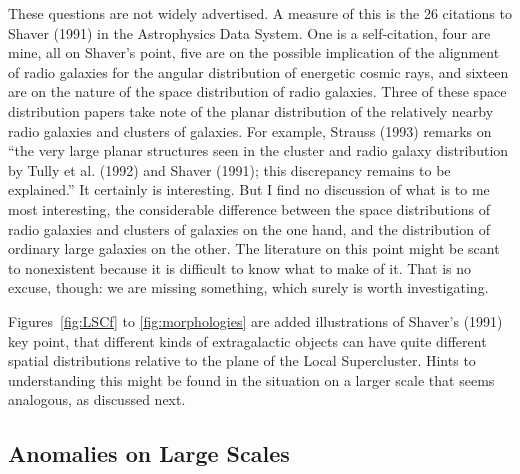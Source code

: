 \documentclass[fleqn,usenatbib]{mnras}
\begin{document}
These questions are not widely advertised. A measure of this is the 26 citations to Shaver (1991) in the Astrophysics Data System. One is a self-citation, four are mine, all on Shaver's point, five are on the possible implication of the alignment of radio galaxies for the angular distribution of energetic cosmic rays, and sixteen are on the nature of the space distribution of radio galaxies. Three of these space distribution papers take note of the planar distribution of the relatively nearby radio galaxies and clusters of galaxies. For example, Strauss (1993) remarks on ``the very large planar structures seen in the cluster and radio galaxy distribution by Tully et al. (1992) and Shaver (1991); this discrepancy remains to be explained.''  It certainly is interesting. But I find no discussion of what is to me most interesting, the considerable difference between the space distributions of radio galaxies and clusters of galaxies on the one hand, and the distribution of ordinary large galaxies on the other. The literature on this point might be scant to nonexistent because it is difficult to know what to make of it. That is no excuse, though: we are missing something, which surely is worth investigating.

Figures~\ref{fig:LSCf} to \ref{fig:morphologies} are added illustrations of Shaver's (1991) key point, that different kinds of extragalactic objects can have quite different spatial distributions relative to the plane of the Local Supercluster. Hints to understanding this might be found in the situation on a larger scale that seems analogous, as discussed next. 

\subsection{Anomalies on Large Scales}\label{CosPrin}
\end{document}
